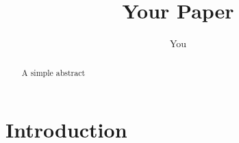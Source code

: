 \documentclass{article}
\title{Your Paper}
\author{You}
\begin{document}
\section{Introduction}
\maketitle
\begin{abstract}
A simple abstract
\end{abstract}




\end{document}
